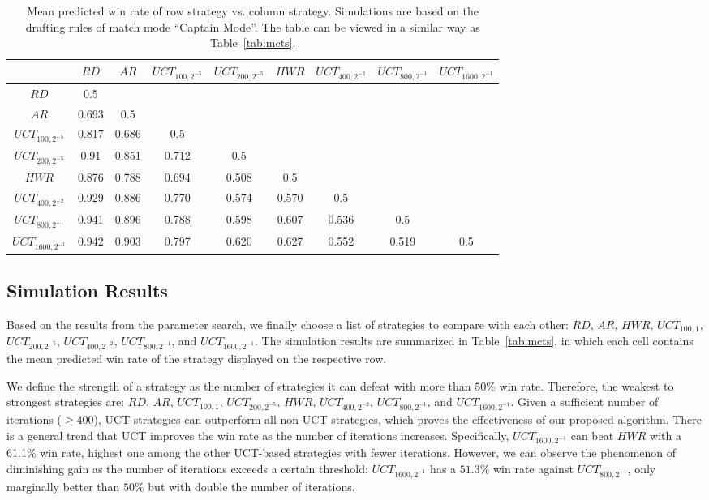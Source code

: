 \begin{table}
  \begin{adjustwidth}{-.7in}{-.5in}
  \caption{Mean predicted win rate of row strategy  vs. column strategy. Simulations are based on the drafting rules of match mode ``Captain Mode''. The table can be viewed in a similar way as Table~\ref{tab:mcts}.}
  \label{tab:mcts_captain_mode}
  \centering
  \begin{tabular}{ccccccccc}
    \toprule
      & $RD$ & $AR$ & $UCT_{100, 2^{-5}}$ & $UCT_{200, 2^{-5}}$ & $HWR$  & $UCT_{400, 2^{-2}}$ & $UCT_{800, 2^{-1}}$ & $UCT_{1600, 2^{-1}}$ \\
    \midrule
    $RD$ & 0.5 &  &  &  &  &  &  &  \\
    $AR$ & 0.693 & 0.5 &  &  &  &  &  & \\
    $UCT_{100, 2^{-5}}$ & 0.817 & 0.686 & 0.5 & & &  &  \\
    $UCT_{200, 2^{-5}}$ & 0.91 & 0.851 & 0.712 & 0.5 & & & \\
    $HWR$ & 0.876 & 0.788 & 0.694  & 0.508 & 0.5 \\
    $UCT_{400, 2^{-2}}$ & 0.929 & 0.886 & 0.770 & 0.574 & 0.570 &  0.5  \\
    $UCT_{800, 2^{-1}}$ & 0.941 & 0.896 & 0.788 & 0.598 & 0.607 & 0.536 & 0.5 &  \\
$UCT_{1600, 2^{-1}}$ & 0.942 & 0.903 & 0.797 & 0.620 & 0.627 & 0.552 & 0.519 &  0.5 \\
  \bottomrule
  \end{tabular}
\end{adjustwidth}
\end{table}


\subsection{Simulation Results}
Based on the results from the parameter search, we finally choose a list of strategies to compare with each other: $RD$, $AR$, $HWR$, $UCT_{100, 1}$, $UCT_{200, 2^{-5}}$, $UCT_{400, 2^{-2}}$, $UCT_{800, 2^{-1}}$, and $UCT_{1600, 2^{-1}}$. The simulation results are summarized in Table~\ref{tab:mcts}, in which each cell contains the mean predicted win rate of the strategy displayed on the respective row. 

We define the strength of a strategy as the number of strategies it can defeat with more than $50\%$ win rate. Therefore, the weakest to strongest strategies are: $RD$, $AR$, $UCT_{100, 1}$, $UCT_{200, 2^{-5}}$, $HWR$, $UCT_{400, 2^{-2}}$, $UCT_{800, 2^{-1}}$, and $UCT_{1600, 2^{-1}}$. Given a sufficient number of iterations ($\geq400$), UCT strategies can outperform all non-UCT strategies, which proves the effectiveness of our proposed algorithm. There is a general trend that UCT improves the win rate as the number of iterations increases. Specifically, $UCT_{1600, 2^{-1}}$ can beat $HWR$ with a 61.1\% win rate, highest one among the other UCT-based strategies with fewer iterations. However, we can observe the phenomenon of diminishing gain as the number of iterations exceeds a certain threshold: $UCT_{1600, 2^{-1}}$ has a $51.3\%$ win rate against $UCT_{800, 2^{-1}}$, only marginally better than $50\%$ but with double the number of iterations.

